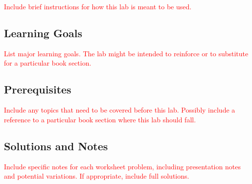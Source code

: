 




\thispagestyle{fancy} %

\noindent \textcolor{red}{Include brief instructions for how this lab is meant to be used.}

\subsection*{Learning Goals}

\textcolor{red}{List major learning goals. The lab might be intended to reinforce or to substitute for a particular book section.}

\subsection*{Prerequisites}

\textcolor{red}{Include any topics that need to be covered before this lab. Possibly include a reference to a particular book section where this lab should fall.}

\subsection*{Solutions and Notes}

\textcolor{red}{Include specific notes for each worksheet problem, including presentation notes and potential variations. If appropriate, include full solutions.}


